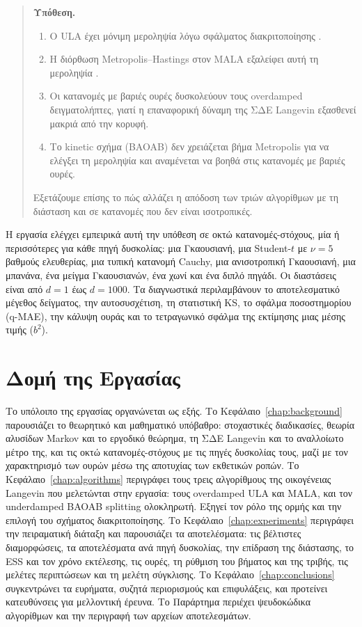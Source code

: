 \begin{quote}
\textbf{Υπόθεση.}
\begin{enumerate}
  \item Ο ULA έχει μόνιμη μεροληψία λόγω σφάλματος διακριτοποίησης
        \citep{durmus2017nonasymptotic}.
  \item Η διόρθωση Metropolis--Hastings στον MALA εξαλείφει αυτή τη μεροληψία
        \citep{roberts1998optimal}.
  \item Οι κατανομές με βαριές ουρές δυσκολεύουν τους overdamped δειγματολήπτες,
        γιατί η επαναφορική δύναμη της ΣΔΕ Langevin εξασθενεί μακριά από την κορυφή.
  \item Το kinetic σχήμα (BAOAB) δεν χρειάζεται βήμα Metropolis για να ελέγξει τη
        μεροληψία \citep{leimkuhler2013bao} και αναμένεται να βοηθά στις κατανομές με
        βαριές ουρές.
\end{enumerate}
Εξετάζουμε επίσης το πώς αλλάζει η απόδοση των τριών αλγορίθμων με τη διάσταση και σε
κατανομές που δεν είναι ισοτροπικές.
\end{quote}

Η εργασία ελέγχει εμπειρικά αυτή την υπόθεση σε οκτώ κατανομές-στόχους, μία ή
περισσότερες για κάθε πηγή δυσκολίας: μια Γκαουσιανή, μια Student-$t$ με $\nu=5$
βαθμούς ελευθερίας, μια τυπική κατανομή Cauchy, μια ανισοτροπική Γκαουσιανή, μια
μπανάνα, ένα μείγμα Γκαουσιανών, ένα χωνί και ένα διπλό πηγάδι. Οι διαστάσεις
είναι από $d=1$ έως $d=1000$. Τα διαγνωστικά περιλαμβάνουν το αποτελεσματικό
μέγεθος δείγματος, την αυτοσυσχέτιση, τη στατιστική KS, το σφάλμα ποσοστημορίου (q-MAE), την κάλυψη
ουράς και το τετραγωνικό σφάλμα της εκτίμησης μιας μέσης τιμής ($b^2$).

\section{Δομή της Εργασίας}
\label{sec:intro-outline}

Το υπόλοιπο της εργασίας οργανώνεται ως εξής.
Το Κεφάλαιο~\ref{chap:background} παρουσιάζει το θεωρητικό και μαθηματικό
υπόβαθρο: στοχαστικές διαδικασίες, θεωρία αλυσίδων Markov και το εργοδικό
θεώρημα, τη ΣΔΕ Langevin και το αναλλοίωτο μέτρο της, και τις οκτώ κατανομές-στόχους
με τις πηγές δυσκολίας τους, μαζί με τον χαρακτηρισμό των ουρών μέσω της
αποτυχίας των εκθετικών ροπών.
Το Κεφάλαιο~\ref{chap:algorithms} περιγράφει τους τρεις αλγορίθμους
της οικογένειας Langevin που μελετώνται στην εργασία: τους overdamped ULA και MALA, και τον
underdamped BAOAB splitting ολοκληρωτή. Εξηγεί τον ρόλο της ορμής και
την επιλογή του σχήματος διακριτοποίησης.
Το Κεφάλαιο~\ref{chap:experiments} περιγράφει την πειραματική διάταξη και
παρουσιάζει τα αποτελέσματα: τις βέλτιστες διαμορφώσεις, τα αποτελέσματα ανά πηγή
δυσκολίας, την επίδραση της διάστασης, το ESS και τον χρόνο εκτέλεσης, τις ουρές, τη
ρύθμιση του βήματος και της τριβής, τις μελέτες περιπτώσεων και τη μελέτη σύγκλισης.
Το Κεφάλαιο~\ref{chap:conclusions} συγκεντρώνει τα ευρήματα,
συζητά περιορισμούς και επιφυλάξεις, και προτείνει κατευθύνσεις για μελλοντική
έρευνα. Το Παράρτημα περιέχει ψευδοκώδικα αλγορίθμων και την περιγραφή των αρχείων
αποτελεσμάτων.
